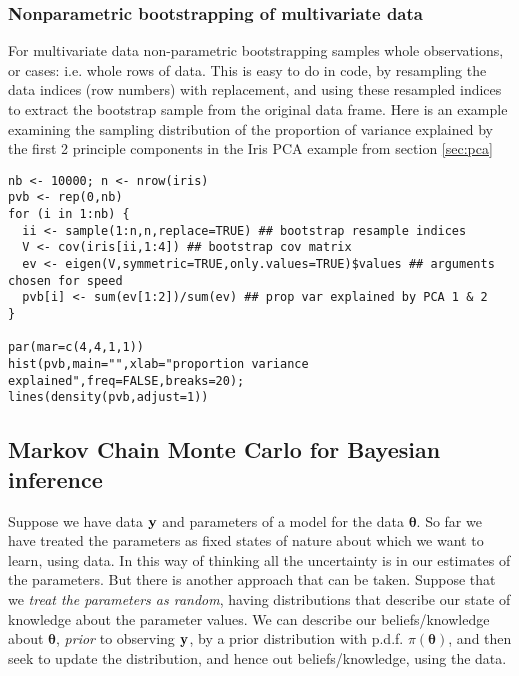 \documentclass[10pt] {article}
\newcommand{\eps}[3]
{{\begin{center}
 \rotatebox{#1}{\scalebox{#2}{\texttt{[image: \#3]}}}
 \end{center}}
}
\theoremstyle{definition}
\begin{document}
\subsubsection{Nonparametric bootstrapping of multivariate data}

For multivariate data non-parametric bootstrapping samples whole observations, or cases: i.e. whole rows of data. This is easy to do in code, by resampling the data indices (row numbers) with replacement, and using these resampled indices to extract the bootstrap sample from the original data frame. Here is an example examining the sampling distribution of the proportion of variance explained by the first 2 principle components in the Iris PCA example from section \ref{sec:pca} 
\begin{lstlisting}
nb <- 10000; n <- nrow(iris)
pvb <- rep(0,nb)
for (i in 1:nb) {
  ii <- sample(1:n,n,replace=TRUE) ## bootstrap resample indices
  V <- cov(iris[ii,1:4]) ## bootstrap cov matrix
  ev <- eigen(V,symmetric=TRUE,only.values=TRUE)$values ## arguments chosen for speed
  pvb[i] <- sum(ev[1:2])/sum(ev) ## prop var explained by PCA 1 & 2
}

par(mar=c(4,4,1,1))
hist(pvb,main="",xlab="proportion variance explained",freq=FALSE,breaks=20);
lines(density(pvb,adjust=1))
\end{lstlisting}
\eps{-90}{.5}{pca-bs.eps}

\subsection{Markov Chain Monte Carlo for Bayesian inference}

Suppose we have data $\bf y$ and parameters of a model for the data $\bm \theta$. So far we have treated the parameters as fixed states of nature about which we want to learn, using data. In this way of thinking all the uncertainty is in our estimates of the parameters. But there is another approach that can be taken. Suppose that we {\em treat the parameters as random}, having distributions that describe our state of knowledge about the parameter values. We can describe our beliefs/knowledge about $\bm \theta$, {\em prior} to observing $\bf y$, by a prior distribution with p.d.f. $\pi ({\bm\theta})$, and then seek to update the distribution, and hence out beliefs/knowledge, using the data. 
\end{document}
